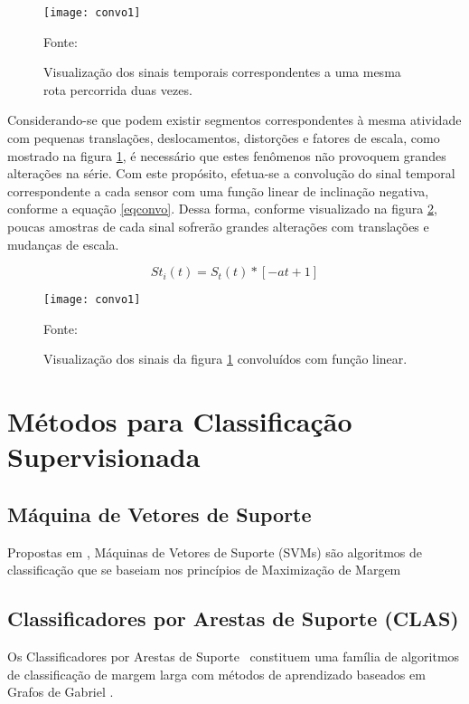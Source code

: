 \documentclass[
	12pt,				%
	openright,			%
	twoside,			%
	a4paper,			%
	english,			%
	spanish,			%
	brazil,				%
	]{abntex2}\usepackage[]{graphicx}\usepackage[]{color}
\begin{document}
\begin{figure}[ht]
\centering
\texttt{[image: convo1]}
\caption{Visualização dos sinais temporais correspondentes a uma mesma rota percorrida duas vezes.}
Fonte: \cite{Lundstrom2016}
\label{figconvo1}
\end{figure}

Considerando-se que podem existir segmentos correspondentes à mesma atividade com pequenas translações, deslocamentos, distorções e fatores de escala, como mostrado na figura \ref{figconvo1}, é necessário que estes fenômenos não provoquem grandes alterações na série. Com este propósito, efetua-se a convolução do sinal temporal correspondente a cada sensor com uma função linear de inclinação negativa, conforme a equação \ref{eqconvo}. Dessa forma, conforme visualizado na figura \ref{figconvo2}, poucas amostras de cada sinal sofrerão grandes alterações com translações e mudanças de escala.

\begin{equation}
\label{eqconvo}
    St_i(t) = S_t(t) \ast [-at + 1]
\end{equation}

\begin{figure}[ht]
\centering
\texttt{[image: convo1]}
\caption{Visualização dos sinais da figura \ref{figconvo1} convoluídos com função linear.}
Fonte: \cite{Lundstrom2016}
\label{figconvo2}
\end{figure}

\section{Métodos para Classificação Supervisionada}

\subsection{Máquina de Vetores de Suporte}

Propostas em \cite{Vapnik}, Máquinas de Vetores de Suporte (SVMs) são algoritmos de classificação que se baseiam nos princípios de Maximização de Margem

\subsection{Classificadores por Arestas de Suporte (CLAS)}

Os Classificadores por Arestas de Suporte~\cite{Torres2016} constituem uma família de algoritmos de classificação de margem larga com métodos de aprendizado baseados em Grafos de Gabriel \cite{Gabriel1969}.
\end{document}

